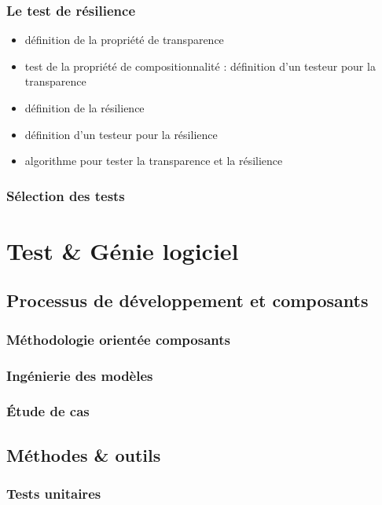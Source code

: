 \documentclass[french,a4paper,leqno,twoside]{book}
\begin{document}
\section{Le test de r\'esilience}
\begin{itemize}
   \item d\'efinition de la propri\'et\'e de transparence
  \item test de la propri\'et\'e de compositionnalit\'e :
    d\'efinition d'un testeur pour la transparence
  \item d\'efinition de la r\'esilience
  \item d\'efinition d'un testeur pour la r\'esilience
  \item algorithme pour tester la transparence et la r\'esilience
\end{itemize}

\section{S\'election des tests}

\part{Test \& G\'enie logiciel}

\chapter{Processus de d\'eveloppement et composants}

\section{M\'ethodologie orient\'ee composants}
\section{Ing\'enierie des mod\`eles}
\section{\'Etude de cas}

\chapter{M\'ethodes \& outils}
 
\section{Tests unitaires}
\end{document}
